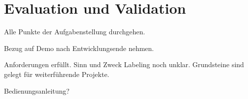 \chapter{Evaluation und Validation}
Alle Punkte der Aufgabenstellung durchgehen.

Bezug auf Demo nach Entwicklungsende nehmen.


Anforderungen erfüllt.
Sinn und Zweck Labeling noch unklar.
Grundsteine sind gelegt für weiterführende Projekte.

Bedienungsanleitung?
